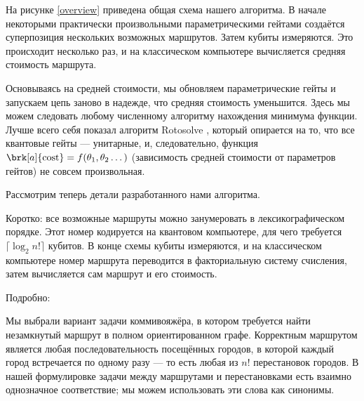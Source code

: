 
На рисунке \ref{overview} приведена общая схема нашего алгоритма. В начале некоторыми практически произвольными параметрическими гейтами создаётся суперпозиция нескольких возможных маршрутов. Затем кубиты измеряются. Это происходит несколько раз, и на классическом компьютере вычисляется средняя стоимость маршрута.


Основываясь на средней стоимости, мы обновляем параметрические гейты и запускаем цепь заново в надежде, что средняя стоимость уменьшится. Здесь мы можем следовать любому численному алгоритму нахождения минимума функции. Лучше всего себя показал алгоритм Rotosolve \cite{rotosolve}, который опирается на то, что все квантовые гейты --- унитарные, и, следовательно, функция $\brk[a]{\text{cost}} = f(\theta_1, \theta_2 \dots)$ (зависимость средней стоимости от параметров гейтов) не совсем произвольная.

Рассмотрим теперь детали разработанного нами алгоритма.




Коротко: все возможные маршруты можно занумеровать в лексикографическом порядке. Этот номер кодируется на квантовом компьютере, для чего требуется $\lceil \log_2 n! \rceil$ кубитов. В конце схемы кубиты измеряются, и на классическом компьютере номер маршрута переводится в факториальную систему счисления, затем вычисляется сам маршрут и его стоимость.


Подробно:



Мы выбрали вариант задачи коммивояжёра, в котором требуется найти незамкнутый маршрут в полном ориентированном графе. Корректным маршрутом является любая последовательность посещённых городов, в которой каждый город встречается по одному разу --- то есть любая из $n!$ перестановок городов. В нашей формулировке задачи между маршрутами и перестановками есть взаимно однозначное соответствие; мы можем использовать эти слова как синонимы.


